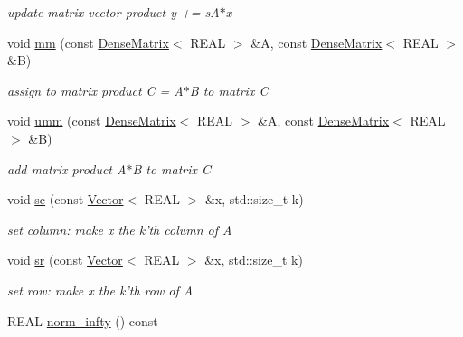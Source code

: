 \begin{DoxyCompactItemize}
\begin{DoxyCompactList}\small\item\em update matrix vector product y += sA$\ast$x \item\end{DoxyCompactList}\item 
void \hyperlink{classhdnum_1_1DenseMatrix_ad79f3e02f3a7a3b2639992cc717470d9}{mm} (const \hyperlink{classhdnum_1_1DenseMatrix}{DenseMatrix}$<$ REAL $>$ \&A, const \hyperlink{classhdnum_1_1DenseMatrix}{DenseMatrix}$<$ REAL $>$ \&B)
\begin{DoxyCompactList}\small\item\em assign to matrix product C = A$\ast$B to matrix C \item\end{DoxyCompactList}\item 
void \hyperlink{classhdnum_1_1DenseMatrix_a45630f26522adf719f3947d09145b7c2}{umm} (const \hyperlink{classhdnum_1_1DenseMatrix}{DenseMatrix}$<$ REAL $>$ \&A, const \hyperlink{classhdnum_1_1DenseMatrix}{DenseMatrix}$<$ REAL $>$ \&B)
\begin{DoxyCompactList}\small\item\em add matrix product A$\ast$B to matrix C \item\end{DoxyCompactList}\item 
void \hyperlink{classhdnum_1_1DenseMatrix_a815aef5dfc09aecd12472dbfd4ab1e37}{sc} (const \hyperlink{classhdnum_1_1Vector}{Vector}$<$ REAL $>$ \&x, std::size\_\-t k)
\begin{DoxyCompactList}\small\item\em set column: make x the k'th column of A \item\end{DoxyCompactList}\item 
void \hyperlink{classhdnum_1_1DenseMatrix_a833f6bd37078251cb91018a7c0c339aa}{sr} (const \hyperlink{classhdnum_1_1Vector}{Vector}$<$ REAL $>$ \&x, std::size\_\-t k)
\begin{DoxyCompactList}\small\item\em set row: make x the k'th row of A \item\end{DoxyCompactList}\item 
\hypertarget{classhdnum_1_1DenseMatrix_aea0ca5908d85d37f61646088e7623159}{
REAL \hyperlink{classhdnum_1_1DenseMatrix_aea0ca5908d85d37f61646088e7623159}{norm\_\-infty} () const }
\label{classhdnum_1_1DenseMatrix_aea0ca5908d85d37f61646088e7623159}


\end{DoxyCompactItemize}
